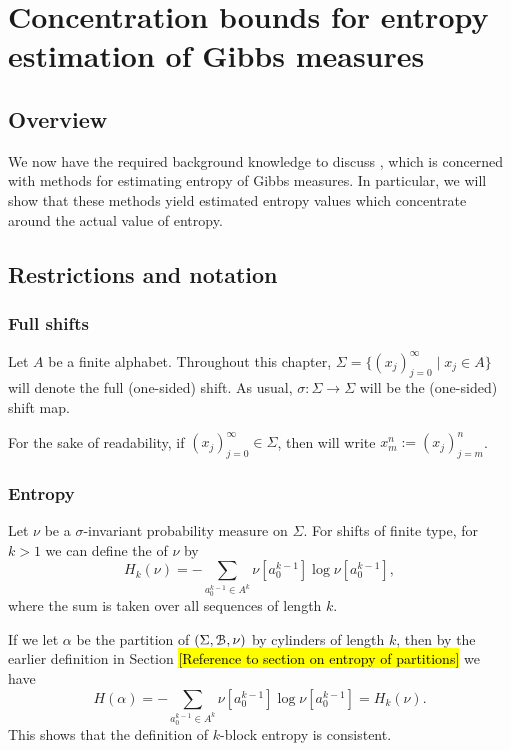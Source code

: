 \chapter[Concentration bounds for entropy estimation]{Concentration bounds for entropy estimation of Gibbs measures}\label{chap:concentration-bounds}
\section{Overview}
We now have the required background knowledge to discuss \cite{chazottes-maldonado:cbfee}, which is concerned with methods for estimating entropy of Gibbs measures. In particular, we will show that these methods yield estimated entropy values which concentrate around the actual value of entropy.

\section{Restrictions and notation}
\subsection{Full shifts}
Let $A$ be a finite alphabet. Throughout this chapter, $\Sigma = \{(x_j)_{j = 0}^\infty \mid x_j \in A\}$ will denote the full (one-sided) shift. As usual, $\sigma : \Sigma \to \Sigma$ will be the (one-sided) shift map.

For the sake of readability, if $(x_j)_{j = 0}^\infty \in \Sigma$, then will write $x_m^n := (x_j)_{j = m}^n$.

\subsection{Entropy}
\begin{definition}
	Let $\nu$ be a $\sigma$-invariant probability measure on $\Sigma$. For shifts of finite type, for $k > 1$ we can define the  of $\nu$ by
	\[
		H_k(\nu) = -\sum_{a_0^{k - 1} \in A^k}{\nu[a_0^{k - 1}] \log\nu[a_0^{k - 1}]},
	\]
	where the sum is taken over all sequences of length $k$.
\end{definition}
If we let $\alpha$ be the partition of $(\Sigma, \mathcal{B}, \nu)$ by cylinders of length $k$, then by the earlier definition in Section \hl{[Reference to section on entropy of partitions]} we have
\[
	H(\alpha) = -\sum_{a_0^{k - 1} \in A^k}{\nu[a_0^{k - 1}] \log\nu[a_0^{k - 1}]} = H_k(\nu).
\]
This shows that the definition of $k$-block entropy is consistent.

